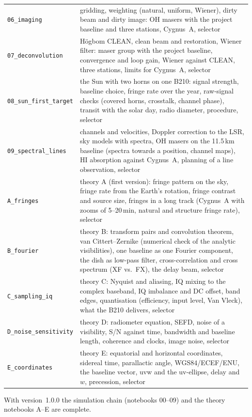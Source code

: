 \begin{longtable}{@{}l>{\raggedright\arraybackslash}p{9.6cm}@{}}
\texttt{06\_imaging} & gridding, weighting (natural, uniform, Wiener),
  dirty beam and dirty image: OH masers with the project baseline and three
  stations, Cygnus~A, selector \\
\texttt{07\_deconvolution} & H\"ogbom CLEAN, clean beam and restoration,
  Wiener filter: maser group with the project baseline, convergence and
  loop gain, Wiener against CLEAN, three stations, limits for Cygnus~A,
  selector \\
\texttt{08\_sun\_first\_target} & the Sun with two horns on one B210:
  signal strength, baseline choice, fringe rate over the year, raw-signal
  checks (covered horns, crosstalk, channel phase), transit with the solar
  day, radio diameter, procedure, selector \\
\texttt{09\_spectral\_lines} & channels and velocities, Doppler correction
  to the LSR, sky models with spectra, OH masers on the 11.5\,km baseline
  (spectra towards a position, channel maps), HI absorption against
  Cygnus~A, planning of a line observation, selector \\
\texttt{A\_fringes} & theory A (first version): fringe pattern on the
  sky, fringe rate from the Earth's rotation, fringe contrast and source
  size, fringes in a long track (Cygnus~A with zooms of 5--20\,min,
  natural and structure fringe rate), selector \\
\texttt{B\_fourier} & theory B: transform pairs and convolution theorem,
  van Cittert--Zernike (numerical check of the analytic visibilities), one
  baseline as one Fourier component, the dish as low-pass filter,
  cross-correlation and cross spectrum (XF vs.\ FX), the delay beam,
  selector \\
\texttt{C\_sampling\_iq} & theory C: Nyquist and aliasing, IQ mixing to the
  complex baseband, IQ imbalance and DC offset, band edges, quantisation
  (efficiency, input level, Van Vleck), what the B210 delivers, selector \\
\texttt{D\_noise\_sensitivity} & theory D: radiometer equation, SEFD, noise
  of a visibility, S/N against time, bandwidth and baseline length,
  coherence and clocks, image noise, selector \\
\texttt{E\_coordinates} & theory E: equatorial and horizontal coordinates,
  sidereal time, parallactic angle, WGS84/ECEF/ENU, the baseline vector,
  uvw and the uv-ellipse, delay and $w$, precession, selector \\
\end{longtable}
With version~1.0.0 the simulation chain (notebooks 00--09) and the theory
notebooks A--E are complete.

